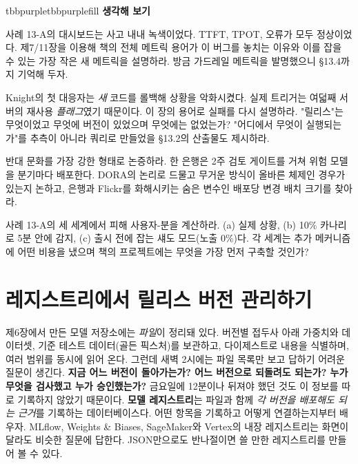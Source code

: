 \begin{calloutbox}{tbbpurple}{tbbpurplefill}
{\normalsize\bfseries\color{tbbpurple}생각해 보기}\par\vspace{3pt}
\begin{tbbitemize}
  \item 사례 13-A의 대시보드는 사고 내내 녹색이었다. TTFT, TPOT, 오류가 모두 정상이었다. 제7/11장을 이용해 책의 전체 메트릭 용어가 이 버그를 놓치는 이유와 이를 잡을 수 있는 가장 작은 새 메트릭을 설명하라. 방금 가드레일 메트릭을 발명했으니 §13.4까지 기억해 두자.
  \item Knight의 첫 대응자는 \textit{새} 코드를 롤백해 상황을 악화시켰다. 실제 트리거는 여덟째 서버의 재사용 \textit{플래그}였기 때문이다. 이 장의 용어로 실패를 다시 설명하라. "릴리스"는 무엇이었고 무엇에 버전이 있었으며 무엇에는 없었는가? "어디에서 무엇이 실행되는가"를 추측이 아니라 쿼리로 만들었을 §13.2의 산출물도 제시하라.
  \item 반대 문화를 가장 강한 형태로 논증하라. 한 은행은 2주 검토 게이트를 거쳐 위험 모델을 분기마다 배포한다. DORA의 논리로 드물고 무거운 방식이 올바른 체제인 경우가 있는지 논하고, 은행과 Flickr를 화해시키는 숨은 변수인 배포당 변경 배치 크기를 찾아라.
  \item 사례 13-A의 세 세계에서 피해 사용자-분을 계산하라. (a) 실제 상황, (b) 10\% 카나리로 5분 안에 감지, (c) 출시 전에 잡는 섀도 모드(노출 0\%)다. 각 세계는 추가 메커니즘에 어떤 비용을 냈으며 책의 프로젝트에는 무엇을 가장 먼저 구축할 것인가?
\end{tbbitemize}
\end{calloutbox}

\section{레지스트리에서 릴리스 버전 관리하기}

제6장에서 만든 모델 저장소에는 \textit{파일}이 정리돼 있다. 버전별 접두사 아래 가중치와 데이터셋, 기준 테스트 데이터(골든 픽스처)를 보관하고, 다이제스트로 내용을 식별하며, 여러 범위를 동시에 읽어 온다. 그런데 새벽 2시에는 파일 목록만 보고 답하기 어려운 질문이 생긴다. \textbf{지금 어느 버전이 돌아가는가? 어느 버전으로 되돌려도 되는가? 누가 무엇을 검사했고 누가 승인했는가?} 금요일에 12분이나 뒤져야 했던 것도 이 정보를 따로 기록하지 않았기 때문이다. \textbf{모델 레지스트리}는 파일과 함께 \textit{각 버전을 배포해도 되는 근거}를 기록하는 데이터베이스다. 어떤 항목을 기록하고 어떻게 연결하는지부터 배우자. MLflow, Weights \& Biases, SageMaker와 Vertex의 내장 레지스트리는 화면이 달라도 비슷한 질문에 답한다. JSON만으로도 반나절이면 쓸 만한 레지스트리를 만들어 볼 수 있다.

